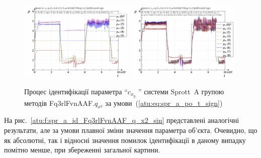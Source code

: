 \begin{figure}[htb!]
  \centerline{
    \includegraphics[width=0.49\textwidth]{p/cha/spr_a/Fq3rlFvnAAF_x2/sprott_a_id-p_t_pi_Fq3rlFvnAAF_sign.png}
    \hfill
    \includegraphics[width=0.49\textwidth]{p/cha/spr_a/Fq3rlFvnAAF_x2/sprott_a_id-p_t_p_Fq3rlFvnAAF_sign.png}
  }
\caption{Процес ідентифікації параметра ``$ c_{x_y} $ '' системи Sprott~A групою методів Fq3rlFvnAAF.$q_{x^2} $ за умови~(\ref{atu:eq:spr_a_po_t_sign})}
  \label{atu:f:spr_a_id_Fq3rlFvnAAF_q_x2_sign}
\end{figure}

На рис.~\ref{atu:f:spr_a_id_Fq3rlFvnAAF_q_x2_sin} представлені аналогічні
результати, але за умови плавної зміни значення параметра
об'єкта. Очевидно, що як абсолютні, так і відносні значення
помилок ідентифікації в даному випадку помітно менше, при
збереженні загальної картини. %

